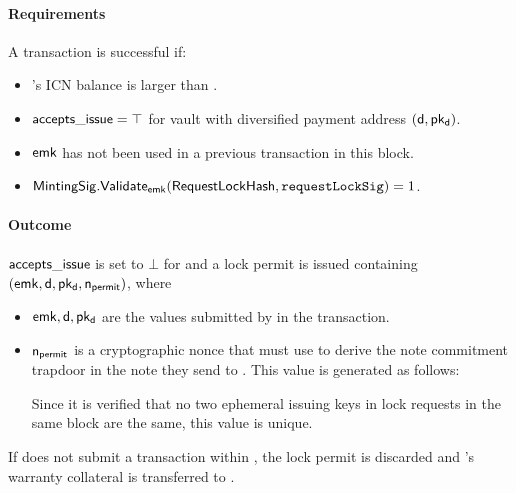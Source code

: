 \paragraph{Requirements}
A \requestLock transaction is successful if:
\begin{itemize}
    \item \issuer's ICN balance is larger than \iw.
    \item $\mathsf{accepts\_issue} = \top$ for vault \vault with diversified payment address $(\mathsf{d}, \mathsf{pk_d})$.
    \item $\mathsf{emk}$ has not been used in a previous \requestLock transaction in this block.
    \item $\mathsf{MintingSig}.\mathsf{Validate}_{\mathsf{emk}}(\mathsf{RequestLockHash}, \mathtt{requestLockSig}) = 1$.
\end{itemize}

\paragraph{Outcome}
$\mathsf{accepts\_issue}$ is set to $\bot$ for \vault and a lock permit is issued containing $(\mathsf{emk}, \mathsf{d}, \mathsf{pk_d}, \mathsf{n_{permit}})$, where
\begin{itemize}
    \item $\mathsf{emk}, \mathsf{d}, \mathsf{pk_d}$ are the values submitted by \issuer in the \requestLock transaction.
    \item $\mathsf{n_{permit}}$ is a cryptographic nonce that \issuer must use to derive the note commitment trapdoor in the note they send to \vault. This value is generated as follows:
    
    Since it is verified that no two ephemeral issuing keys in lock requests in the same block are the same, this value is unique.
\end{itemize}

If \issuer does not submit a \mint transaction within \dm, the lock permit is discarded and \issuer's warranty collateral \iw is transferred to \vault.

\subsection{\lockop}
\label{sec:lock}

